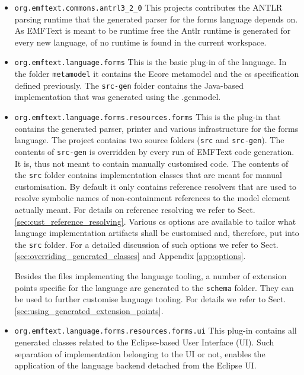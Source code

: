 	\begin{itemize} 
	  \item \texttt{org.emftext.commons.antrl3\_2\_0} This projects contributes the
	  ANTLR parsing runtime that the generated parser for the forms language
	  depends on. As EMFText is meant to be runtime free the Antlr runtime is generated
	  for every new language, of no runtime is found in the current workspace.
	  \item \texttt{org.emftext.language.forms} This is the basic plug-in of the
	  language. In the folder \texttt{metamodel} it contains the Ecore metamodel
	  and the cs specification defined previously. The \texttt{src-gen} folder contains the Java-based implementation that was
	  generated using the .genmodel.
	  \item \texttt{org.emftext.language.forms.resources.forms}
	  This is the plug-in that contains the generated parser, printer and various
	  infrastructure for the forms language. The project contains two source
	  folders (\texttt{src} and \texttt{src-gen}). The contents of \texttt{src-gen}
	  is overridden by every run of EMFText code generation. It is, thus not meant
	  to contain manually customised code. The contents of the \texttt{src} folder
	  contains implementation classes that are meant for manual customisation. By
	  default it only contains reference resolvers that are used to resolve
	  symbolic names of non-containment references to the model element actually
	  meant. For details on reference resolving we refer to Sect.
	  \ref{sec:cust_reference_resolving}. Various cs options are available to
	  tailor what language implementation artifacts shall be customised and, therefore, 
	  put into the \texttt{src} folder. For a
	  detailed discussion of such options we refer to Sect. \ref{sec:overriding_generated_classes} and
	  Appendix \ref{app:options}.
	  
	  Besides the files implementing the language tooling, a number of extension
	  points specific for the language are generated to the \texttt{schema} folder. 
	  They can be used to further customise language tooling. For details we refer
	  to Sect. \ref{sec:using_generated_extension_points}.
	  
	  \item \texttt{org.emftext.language.forms.resources.forms.ui} This plug-in 
	  contains all generated classes related to the Eclipse-based User Interface
	  (UI). Such separation of implementation belonging to the UI or not, enables
	  the application of the language backend detached from the Eclipse UI.
	\end{itemize}
	
